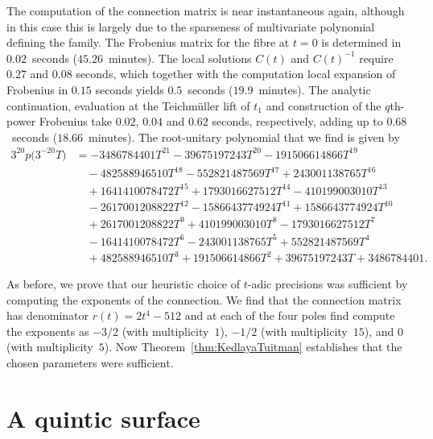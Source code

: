 The computation of the connection matrix is near instantaneous 
again, although in this case this is largely due to the sparseness 
of multivariate polynomial defining the family.  The Frobenius 
matrix for the fibre at $t = 0$ is determined in $0.02$~seconds 
($45.26$~minutes).  The local solutions $C(t)$ and $C(t)^{-1}$ 
require $0.27$ and $0.08$ seconds, which together with the 
computation local expansion of Frobenius in $0.15$ seconds 
yields $0.5$~seconds ($19.9$~minutes).  The analytic continuation, 
evaluation at the Teichm\"uller lift of $t_1$  and construction 
of the $q$th-power Frobenius take $0.02$, $0.04$ and $0.62$ seconds, 
respectively, adding up to $0.68$~seconds ($18.66$~minutes).  The 
root-unitary polynomial that we find is given by 
\begin{equation*}
\begin{split}
3^{20} p\bigl(3^{-20} T\bigr) & = 
  -3486784401 T^{21} - 39675197243 T^{20} - 191506614866 T^{19} \\
& \quad - 482588946510 T^{18} - 552821487569 T^{17} + 243001138765 T^{16} \\
& \quad + 1641410078472 T^{15} + 1793016627512 T^{14} - 410199003010 T^{13} \\
& \quad - 2617001208822 T^{12} - 1586643774924 T^{11} + 1586643774924 T^{10} \\
& \quad + 2617001208822 T^9 + 410199003010 T^8 - 1793016627512 T^7 \\
& \quad - 1641410078472 T^6 - 243001138765 T^5 + 552821487569 T^4 \\
& \quad + 482588946510 T^3 + 191506614866 T^2 + 39675197243 T + 3486784401.
\end{split}
\end{equation*}

As before, we prove that our heuristic choice of $t$-adic precisions 
was sufficient by computing the exponents of the connection. 
We find that the connection matrix has denominator $r(t) = 2 t^4 - 512$ 
and at each of the four poles find compute the exponents as 
$-3/2$ (with multiplicity~$1$), $-1/2$ (with multiplicity~$15$), 
and $0$ (with multiplicity~$5$).
Now Theorem~\ref{thm:KedlayaTuitman} establishes that the chosen 
parameters were sufficient.

\section{A quintic surface}

